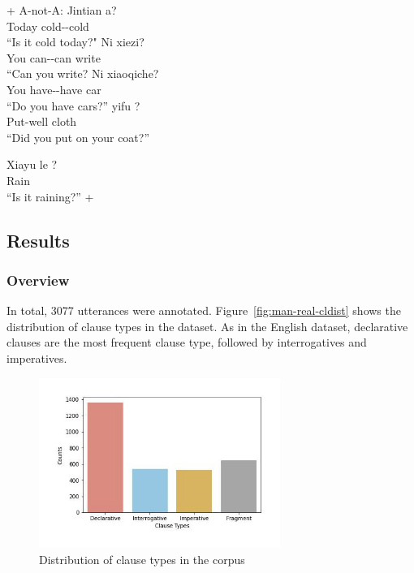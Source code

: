 + A-not-A: 
\bxl
\gll Jintian  a?\\
Today cold-\Neg-cold \Sfp{}\\
\trans ``Is it cold today?" \hfill {}
\ex 
\gll Ni  xiezi?\\
You can-\Neg-can write\\
\trans ``Can you write? \hfill {}
\ex \gll Ni  xiaoqiche?\\
You have-\Neg-have car\\
\trans ``Do you have cars?'' \hfill {}
\ex 
\gll {} yifu ?\\
Put-well cloth \Neg{}\\
\trans ``Did you put on your coat?'' \hfill {}
\exl
\eex

\gll Xiayu le ?\\
Rain \Asp{} \\
\trans ``Is it raining?'' \hfill +
\eex

\subsection{Results}
\label{sec:mancl:corpus:results}

\subsubsection{Overview}
\label{sec:mancl:corpus:results:mapping}

In total, 3077 utterances were annotated. Figure~\ref{fig:man-real-cldist} shows the distribution of clause types in the dataset. As in the English dataset, declarative clauses are the most frequent clause type, followed by interrogatives and imperatives. 

\begin{figure}[H]
    \centering
    \includegraphics[width=0.7\textwidth]{figures/man-real-cldist.jpg}
    \caption{Distribution of clause types in the corpus}
    \label{fig:man:real-cldist}
\end{figure}

